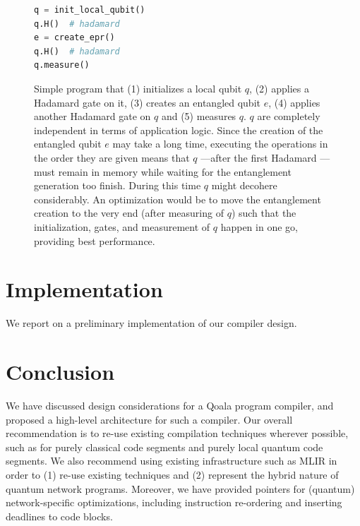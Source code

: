 \begin{figure}[t]
  \centering
  \begin{lstlisting}[language=Python]
q = init_local_qubit()
q.H()  # hadamard
e = create_epr()
q.H()  # hadamard
q.measure()
  \end{lstlisting}
  \caption{Simple program that (1) initializes a local qubit $q$, (2) applies a Hadamard gate on it, (3) creates an entangled qubit $e$, (4) applies another Hadamard gate on $q$ and (5) measures $q$.
  $q$ are completely independent in terms of application logic.
  Since the creation of the entangled qubit $e$ may take a long time, executing the operations in the order they are given means that $q$ ---after the first Hadamard --- must remain in memory while waiting for the entanglement generation too finish.
  During this time $q$ might decohere considerably.
  An optimization would be to move the entanglement creation to the very end (after measuring of $q$) such that the initialization, gates, and measurement of $q$ happen in one go, providing best performance.
  }
  \label{compiler:lst:reorder-network-ops}
\end{figure}


\section{Implementation}
We report on a preliminary implementation of our compiler design.


\section{Conclusion}
We have discussed design considerations for a Qoala program compiler, and proposed a high-level architecture for such a compiler.
Our overall recommendation is to re-use existing compilation techniques wherever possible, such as for purely classical code segments and purely local quantum code segments.
We also recommend using existing infrastructure such as MLIR in order to (1) re-use existing techniques and (2) represent the hybrid nature of quantum network programs.
Moreover, we have provided pointers for (quantum) network-specific optimizations, including instruction re-ordering and inserting deadlines to code blocks.

